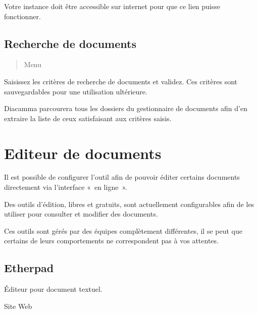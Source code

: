 \documentclass[letterpaper,10pt,french]{sphinxmanual}
\begin{document}
\sphinxAtStartPar
{} Votre instance doit être accessible sur internet pour que ce lien puisse fonctionner.


\subsection{Recherche de documents}
\label{\detokenize{documents/shared_document:recherche-de-documents}}\begin{quote}

\sphinxAtStartPar
Menu 
\end{quote}

\sphinxAtStartPar
Saisissez les critères de recherche de documents et validez. Ces critères sont sauvegardables pour une utilisation ultérieure.

\sphinxAtStartPar
Diacamma parcourera tous les dossiers du gestionnaire de documents afin d’en extraire la liste de ceux satisfaisant aux critères saisis.

\sphinxstepscope


\section{Editeur de documents}
\label{\detokenize{documents/editor:editeur-de-documents}}\label{\detokenize{documents/editor::doc}}
\sphinxAtStartPar
Il est possible de configurer l’outil afin de pouvoir éditer certains documents directement via l’interface « en ligne ».

\sphinxAtStartPar
Des outils d’édition, libres et gratuits, sont actuellement configurables afin de les utiliser pour consulter et modifier des documents.

\sphinxAtStartPar
{} Ces outils sont gérés par des équipes complètement différentes, il se peut que certains de leurs comportements ne correspondent pas à vos attentes.


\subsection{Etherpad}
\label{\detokenize{documents/editor:etherpad}}
\sphinxAtStartPar
Éditeur pour document textuel.

\sphinxAtStartPar
Site Web
\begin{quote}

\sphinxAtStartPar
{}
\end{quote}
\end{document}
